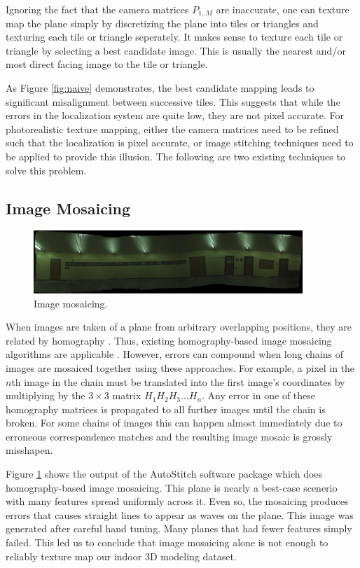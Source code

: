 \documentclass[runningheads]{llncs}
\begin{document}
Ignoring the fact that the camera matrices $P_{1..M}$ are inaccurate, one can texture map the plane simply by discretizing the plane into tiles or triangles and texturing each tile or triangle seperately. It makes sense to texture each tile or triangle by selecting a best candidate image. This is usually the nearest and/or most direct facing image to the tile or triangle. 

As Figure \ref{fig:naive} demonstrates, the best candidate mapping leads to significant misalignment between successive tiles. This suggests that while the errors in the localization system are quite low, they are not pixel accurate. For photorealistic texture mapping, either the camera matrices need to be refined such that the localization is pixel accurate, or image stitching techniques need to be applied to provide this illusion. The following are two existing techniques to solve this problem. 

\subsection{Image Mosaicing}

\begin{figure}
\centering
\includegraphics[width=4in]{panoMy.jpg}
\caption{Image mosaicing. }
\label{fig:mosaic}
\end{figure}


When images are taken of a plane from arbitrary overlapping positions, they are related by homography \cite{hz}. Thus, existing homography-based image mosaicing algorithms are applicable \cite{brown2007automatic}. However, errors can compound when long chains of images are mosaiced together using these approaches. For example, a pixel in the $n$th image in the chain must be translated into the first image's coordinates by multiplying by the $3\times3$ matrix $H_1 H_2 H_3 ... H_n$. Any error in one of these homography matrices is propagated to all further images until the chain is broken. For some chains of images this can happen almost immediately due to erroneous correspondence matches and the resulting image mosaic is grossly misshapen.

Figure \ref{fig:mosaic} shows the output of the AutoStitch software package which does homography-based image mosaicing. This plane is nearly a best-case scenerio with many features spread uniformly across it. Even so, the mosaicing produces errors that causes straight lines to appear as waves on the plane. This image was generated after careful hand tuning. Many planes that had fewer features simply failed. This led us to conclude that image mosaicing alone is not enough to reliably texture map our indoor 3D modeling dataset.
\end{document}
